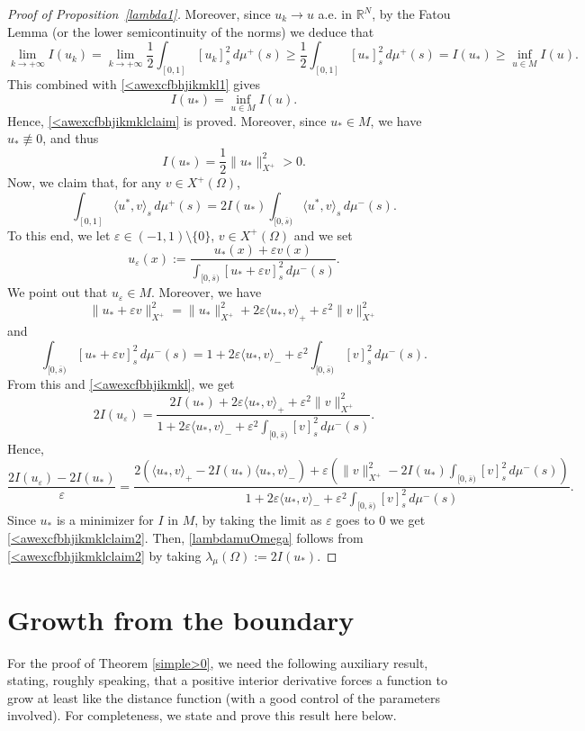 \documentclass[12pt,a4paper,intlimits,sumlimits]{amsart}
\def \R {\mathbb{R}}
\theoremstyle{definition}
\theoremstyle{plain}
\numberwithin{equation}{section}
\renewcommand{\geq}{\geqslant}
\begin{document}
\begin{appendix}
\begin{proof}[Proof of Proposition~\ref{lambda1}]
Moreover,  since $u_k\to u$ a.e. in $\R^N$, by the Fatou Lemma (or the lower semicontinuity of the norms)
we deduce that
\[
\lim_{k\to+\infty}I(u_k)=\lim_{k\to+\infty}\frac{1}{2}\int_{[0, 1]} [u_k]^2_s \, d\mu^+(s)\geq \frac{1}{2}\int_{[0, 1]} [u_*]^2_s \, d\mu^+(s)=I(u_*)\geq \inf_{u\in M} I(u).
\]
This combined with \eqref{<awexcfbhjikmkl1} gives 
\[
I(u_*)= \inf_{u\in M} I(u).
\]
Hence,  \eqref{<awexcfbhjikmklclaim} is proved.
Moreover, since $u_*\in M$, we have $u_* \not \equiv 0$, and thus
\[
I(u_*)=\frac{1}{2}\|u_*\|_{X^+}^2>0.
\]
Now, we claim that, for any $v\in X^+(\Omega)$,
\begin{equation}\label{<awexcfbhjikmklclaim2}
\int_{[0,1]}\langle u^*,v\rangle_s\,d\mu^+(s) 
=2I(u_*)\int_{[0,\overline s)}\langle u^*,v\rangle_s\,d\mu^-(s).
\end{equation}
To this end, we let $\varepsilon\in (-1,1)\setminus \{0\}$, $v\in X^+(\Omega)$ and we set
\[
u_\varepsilon(x):=\frac{u_*(x)+\varepsilon v(x)}{\displaystyle \int_{[0, \overline s)} [u_*+\varepsilon v]^2_s \, d\mu^-(s)}.
\]
We point out that $u_\varepsilon\in M$. Moreover, we have
\[
\|u_*+\varepsilon v\|_{X^+}^2=\|u_*\|_{X^+}^2+2\varepsilon \langle u_*, v\rangle_+ +\varepsilon^2\|v\|_{X^+}^2
\]
and
\[
\int_{[0, \overline s)} [u_*+\varepsilon v]^2_s \, d\mu^-(s)=1+2\varepsilon \langle u_*, v\rangle_- +\varepsilon^2 \int_{[0, \overline s)} [ v]^2_s \, d\mu^-(s).
\]
From this and \eqref{<awexcfbhjikmkl}, we get
\[
2I(u_\varepsilon)=\frac{2I(u_*)+2\varepsilon\langle u_*, v\rangle_+ +\varepsilon^2\|v\|_{X^+}^2}{\displaystyle 1+2\varepsilon \langle u_*, v\rangle_- +\varepsilon^2 \int_{[0, \overline s)} [ v]^2_s \, d\mu^-(s)}.
\]
Hence,
\[
\frac{2I(u_\varepsilon)-2I(u_*)}{\varepsilon}=\frac{2\left(\langle u_*, v\rangle_+ -2I(u_*)\langle u_*, v\rangle_-\right)
+\varepsilon \left(\|v\|_{X^+}^2 -2I(u_*)\displaystyle\int_{[0, \overline s)} [ v]^2_s \, d\mu^-(s)\right)}{\displaystyle 1+2\varepsilon \langle u_*, v\rangle_- +\varepsilon^2 \int_{[0, \overline s)} [ v]^2_s \, d\mu^-(s)}.
\]
Since $u_*$ is a minimizer for $I$ in $M$, by taking the limit as $\varepsilon$ goes to 0 we get \eqref{<awexcfbhjikmklclaim2}.
Then, \eqref{lambdamuOmega} follows from \eqref{<awexcfbhjikmklclaim2} by taking 
$\lambda_\mu(\Omega):=2I(u_*)$.
\end{proof}

\section{Growth from the boundary}
For the proof of Theorem \ref{simple>0}, we need the following auxiliary result, stating, roughly
speaking, that a positive interior derivative forces a function to grow at least like the distance function
(with a good control of the parameters involved). For completeness, we state and prove this result here below.


\end{appendix}
\end{document}
